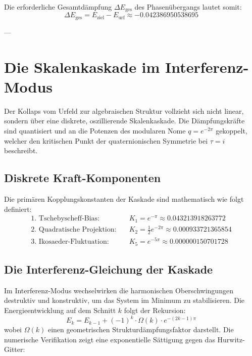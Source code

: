 \documentclass[11pt,a4paper]{article}
\begin{document}
	Die erforderliche Gesamtdämpfung $\Delta E_{\text{ges}}$ des Phasenübergangs lautet somit:
	\begin{equation}
		\Delta E_{\text{ges}} = E_{\text{ziel}} - E_{\text{urf}} \approx -0.042386950538695
	\end{equation}
	
	---
	
	\section{Die Skalenkaskade im Interferenz-Modus}
	
	Der Kollaps vom Urfeld zur algebraischen Struktur vollzieht sich nicht linear, sondern über eine diskrete, oszillierende Skalenkaskade. Die Dämpfungskräfte sind quantisiert und an die Potenzen des modularen Nome $q = e^{-2\pi}$ gekoppelt, welcher den kritischen Punkt der quaternionischen Symmetrie bei $\tau = i$ beschreibt.
	
	\subsection{Diskrete Kraft-Komponenten}
	Die primären Kopplungskonstanten der Kaskade sind mathematisch wie folgt definiert:
	\begin{align}
		\text{1. Tschebyscheff-Bias:} \quad & K_1 = e^{-\pi} \approx 0.043213918263772 \\
		\text{2. Quadratische Projektion:} \quad & K_2 = \frac{1}{2} e^{-2\pi} \approx 0.000933721365854 \\
		\text{3. Ikosaeder-Fluktuation:} \quad & K_5 = e^{-5\pi} \approx 0.000000150701728
	\end{align}
	
	\subsection{Die Interferenz-Gleichung der Kaskade}
	Im Interferenz-Modus wechselwirken die harmonischen Oberschwingungen destruktiv und konstruktiv, um das System im Minimum zu stabilisieren. Die Energieentwicklung auf dem Schnitt $k$ folgt der Rekursion:
	\begin{equation}
		E_{k} = E_{k-1} + (-1)^k \cdot \Omega(k) \cdot e^{-(2k-1)\pi}
	\end{equation}
	wobei $\Omega(k)$ einen geometrischen Strukturdämpfungsfaktor darstellt. Die numerische Verifikation zeigt eine exponentielle Sättigung gegen das Hurwitz-Gitter:
	
\end{document}
